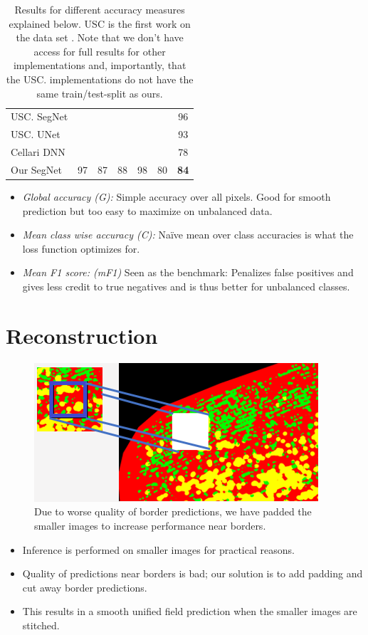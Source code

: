 \documentclass[
    ,title     = {{Image Segmentation for Smart Agriculture}}
    ,subject   = {{This is the subject of my work}}
    ,papersize = {{a1paper}}
    ,nocrop
]{dtuposter}
\begin{document}
\begin{dtupostercontent}
\begin{table}
\begin{tabular}{l|ccc|ccc|}
		\rule[-1ex]{0pt}{2.5ex} USC. SegNet    &    &  &  &  & &   96  \\ 
		\rule[-1ex]{0pt}{2.5ex} USC. UNet   &  &    &  &  & &93  \\ 
		\rule[-1ex]{0pt}{2.5ex} Cellari DNN   &    &  &  &  &  &78  \\ 
		\hline 
		\rule[-1ex]{0pt}{2.5ex} Our SegNet & 97 & 87  &88  & 98  &80&\textbf{84}  \\ 
	\end{tabular} 
\caption{Results for different accuracy measures explained below. USC is the first work on the data set \cite{USC}. Note that we don't have access for full results for other implementations and, importantly, that the USC. implementations do not have the same train/test-split as ours.}
\end{table}

\begin{itemize}
	\item \textit{Global accuracy (G):} Simple accuracy over all pixels. Good for smooth prediction but too easy to maximize on unbalanced data.
	\item \textit{Mean class wise accuracy (C):} Naïve mean over class accuracies is what the loss function optimizes for.
	\item \textit{Mean F1 score: (mF1)} Seen as the  benchmark: Penalizes false positives and gives less credit to true negatives and is thus better for unbalanced classes. 
\end{itemize}

\section{Reconstruction}
\begin{figure}
	\centering
	\includegraphics[width=0.6\linewidth]{"Reconstruction DL"}
	\caption{Due to worse quality of border predictions, we have padded the smaller images to increase performance near borders.}
	\label{fig:reconstruction-dl}
\end{figure}
\begin{itemize}
	\item Inference is performed on smaller images for practical reasons.
	\item Quality of predictions near borders is bad; our solution is to add padding and cut away border predictions.
	\item This results in a smooth unified field prediction when the smaller images are stitched.
\end{itemize}


\end{dtupostercontent}
\end{document}

